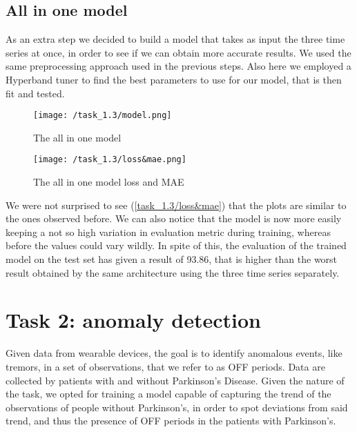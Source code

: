 \documentclass[12pt,a4paper,leqno]{article}
\begin{document}
	\subsection{All in one model}
	As an extra step we decided to build a model that takes as input the three time series at once, in order to see if we can obtain more accurate results. We used the same preprocessing approach used in the previous steps. Also here we employed a Hyperband tuner to find the best parameters to use for our model, that is then fit and tested.
	\begin{figure}
		\centering
		\texttt{[image: /task\_1.3/model.png]}
		\caption{The all in one model}
		\label{task_1.3/model}
	\end{figure}
	\begin{figure}
		\centering
		\texttt{[image: /task\_1.3/loss\&mae.png]}
		\caption{The all in one model loss and MAE}
		\label{task_1.3/loss&mae}
	\end{figure}
	
	We were not surprised to see (\autoref{task_1.3/loss&mae}) that the plots are similar to the ones observed before. We can also notice that the model is now more easily keeping a not so high variation in evaluation metric during training, whereas before the values could vary wildly. In spite of this, the evaluation of the trained model on the test set has given a result of 93.86, that is higher than the worst result obtained by the same architecture using the three time series separately.
	
	\newpage
	
	\section{Task 2: anomaly detection}
	Given data from wearable devices, the goal is to identify anomalous events, like tremors, in a set of observations, that we refer to as OFF periods. Data are collected by patients with and without Parkinson’s Disease. Given the nature of the task, we opted for training a model capable of capturing the trend of the observations of people without Parkinson’s, in order to spot deviations from said trend, and thus the presence of OFF periods in the patients with Parkinson’s.
	
\end{document}
